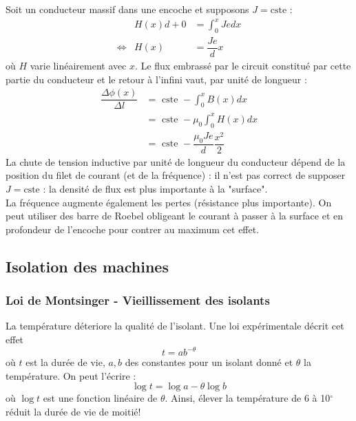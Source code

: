 	Soit un conducteur massif dans une encoche et supposons $J = \text{cste}$ :
	\begin{equation}
	\begin{array}{lll}
	
	& H(x)d + 0 &= \displaystyle\int_0^x Jedx\\
	\Leftrightarrow& H(x) &= \dfrac{Je}{d}x
	\end{array}
	\end{equation}
	où $H$ varie linéairement avec $x$. Le flux embrassé par le circuit constitué 
	par cette partie du conducteur et le retour à l’infini vaut, par unité de 
	longueur :
	\begin{equation}
	\begin{array}{ll}
	\dfrac{\Delta \phi(x)}{\Delta l} &= \text{ cste } - \int_0^x B(x)dx\\
 	&= \text{ cste } - \mu_0\int_0^x H(x) dx\\
	&= \text{ cste } - \dfrac{\mu_0Je}{d}\dfrac{x^2}{2}
	\end{array}
	\end{equation}
	La chute de tension inductive par unité de longueur du conducteur dépend de 
	la position du filet de courant (et de la fréquence) : il n'est pas correct 
	de supposer $J = \text{cste}$ : la densité de flux est plus importante à la 
	"surface".\\
	La fréquence augmente également les pertes (résistance plus importante). On 
	peut utiliser des barre de Roebel obligeant le courant à passer à la surface 
	et en profondeur de l'encoche pour contrer au maximum cet effet.
	
	\subsection{Isolation des machines}
		\subsubsection{Loi de Montsinger - Vieillissement des isolants}
		La température déteriore la qualité de l'isolant. Une loi expérimentale 
		décrit cet effet
		\begin{equation}
		t = ab^{-\theta}
		\end{equation}
		où $t$ est la durée de vie, $a,b$ des constantes pour un isolant donné 
		et $\theta$ la température. On peut l'écrire :
		\begin{equation}
		\log t = \log a - \theta\log b
		\end{equation}
		où $\log t$ est une fonction linéaire de $\theta$. Ainsi, élever la 
		température de 6 à 10$^\circ$ réduit la durée de vie de moitié!
		
